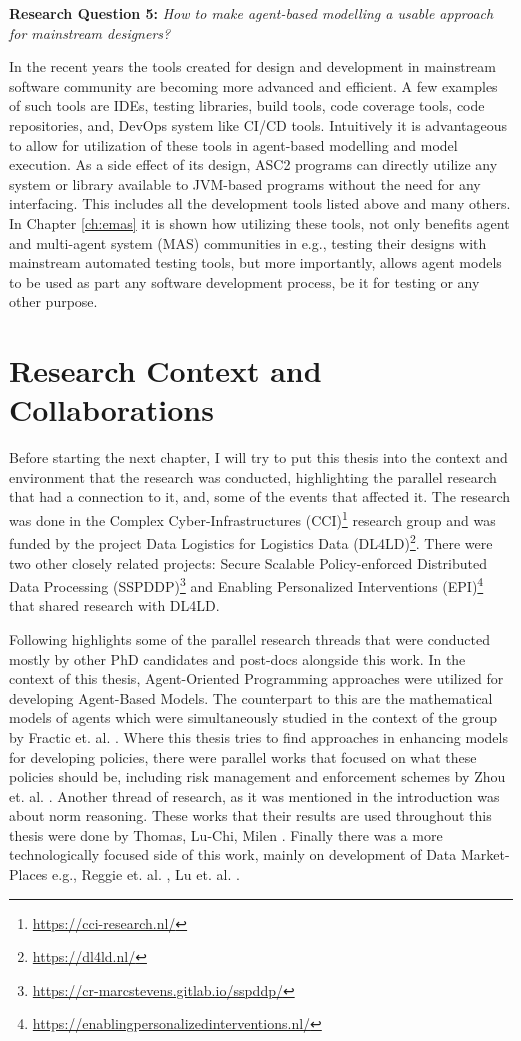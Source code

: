 \textbf{Research Question 5:} \textit{How to make agent-based modelling a usable approach for mainstream designers?}

In the recent years the tools created for design and development in mainstream software community are becoming more advanced and efficient. A few examples of such tools are IDEs, testing libraries, build tools, code coverage tools, code repositories, and, DevOps system like CI/CD tools. Intuitively it is advantageous to allow for utilization of these tools in agent-based modelling and model execution. As a side effect of its design, ASC2 programs can directly utilize any system or library available to JVM-based programs without the need for any interfacing. This includes all the development tools listed above and many others. In Chapter \ref{ch:emas} it is shown how utilizing these tools, not only benefits agent and multi-agent system (MAS) communities in e.g., testing their designs with mainstream automated testing tools, but more importantly, allows agent models to be used as part any software development process, be it for testing or any other purpose.


\section{Research Context and Collaborations}
Before starting the next chapter, I will try to put this thesis into the context and environment that the research was conducted, highlighting the parallel research that had a connection to it, and, some of the events that affected it. The research was done in the Complex Cyber-Infrastructures (CCI)\footnote{\url{https://cci-research.nl/}} research group and was funded by the project Data Logistics for Logistics Data (DL4LD)\footnote{\url{https://dl4ld.nl/}}. There were two other closely related projects: Secure Scalable Policy-enforced Distributed Data Processing (SSPDDP)\footnote{\url{https://cr-marcstevens.gitlab.io/sspddp/}} and Enabling Personalized Interventions (EPI)\footnote{\url{https://enablingpersonalizedinterventions.nl/}} that shared research with DL4LD.

Following highlights some of the parallel research threads that were conducted mostly by other PhD candidates and post-docs alongside this work. In the context of this thesis, Agent-Oriented Programming approaches were utilized for developing Agent-Based Models. The counterpart to this are the mathematical models of agents which were simultaneously studied in the context of the group by Fractic et. al. \cite{Peter}. Where this thesis tries to find approaches in enhancing models for developing policies, there were parallel works that focused on what these policies should be, including risk management and enforcement schemes by Zhou et. al. \cite{Xin}. Another thread of research, as it was mentioned in the introduction was about norm reasoning. These works that their results are used throughout this thesis were done by Thomas, Lu-Chi, Milen \cite{Thomas,Milen,Lu-Chi}. Finally there was a more technologically focused side of this work, mainly on development of Data Market-Places e.g., Reggie et. al. \cite{Reggie}, Lu et. al. \cite{Lu}.

